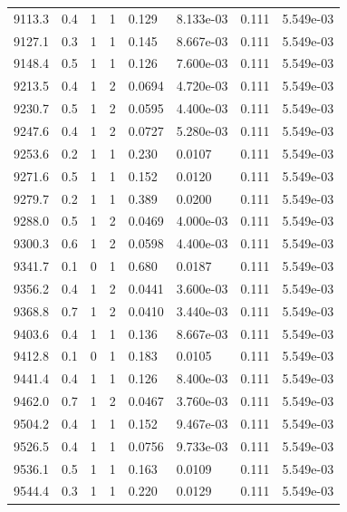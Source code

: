 \documentclass[preview]{standalone}
\begin{document}
{{{{{{{{{{{{\begin{tabular}{L{1.2cm}C{1.2cm} C{0.3cm}C{0.5cm} C{1.4cm}C{1.4cm} C{1.4cm}C{1.4cm}}
  9113.3  &   0.4  & 1     &  1 &  0.129  & 8.133e-03  & 0.111 &  5.549e-03   \\ 
  9127.1  &   0.3  & 1     &  1 &  0.145  & 8.667e-03  & 0.111 &  5.549e-03   \\ 
  9148.4  &   0.5  & 1     &  1 &  0.126  & 7.600e-03  & 0.111 &  5.549e-03   \\ 
  9213.5  &   0.4  & 1     &  2 &  0.0694  & 4.720e-03  & 0.111 &  5.549e-03   \\ 
  9230.7  &   0.5  & 1     &  2 &  0.0595  & 4.400e-03  & 0.111 &  5.549e-03   \\ 
  9247.6  &   0.4  & 1     &  2 &  0.0727  & 5.280e-03  & 0.111 &  5.549e-03   \\ 
  9253.6  &   0.2  & 1     &  1 &  0.230  & 0.0107  & 0.111 &  5.549e-03   \\ 
  9271.6  &   0.5  & 1     &  1 &  0.152  & 0.0120  & 0.111 &  5.549e-03   \\ 
  9279.7  &   0.2  & 1     &  1 &  0.389  & 0.0200  & 0.111 &  5.549e-03   \\ 
  9288.0  &   0.5  & 1     &  2 &  0.0469  & 4.000e-03  & 0.111 &  5.549e-03   \\ 
  9300.3  &   0.6  & 1     &  2 &  0.0598  & 4.400e-03  & 0.111 &  5.549e-03   \\ 
  9341.7  &   0.1  & 0     &  1 &  0.680  & 0.0187  & 0.111 &  5.549e-03   \\ 
  9356.2  &   0.4  & 1     &  2 &  0.0441  & 3.600e-03  & 0.111 &  5.549e-03   \\ 
  9368.8  &   0.7  & 1     &  2 &  0.0410  & 3.440e-03  & 0.111 &  5.549e-03   \\ 
  9403.6  &   0.4  & 1     &  1 &  0.136  & 8.667e-03  & 0.111 &  5.549e-03   \\ 
  9412.8  &   0.1  & 0     &  1 &  0.183  & 0.0105  & 0.111 &  5.549e-03   \\ 
  9441.4  &   0.4  & 1     &  1 &  0.126  & 8.400e-03  & 0.111 &  5.549e-03   \\ 
  9462.0  &   0.7  & 1     &  2 &  0.0467  & 3.760e-03  & 0.111 &  5.549e-03   \\ 
  9504.2  &   0.4  & 1     &  1 &  0.152  & 9.467e-03  & 0.111 &  5.549e-03   \\ 
  9526.5  &   0.4  & 1     &  1 &  0.0756  & 9.733e-03  & 0.111 &  5.549e-03   \\ 
  9536.1  &   0.5  & 1     &  1 &  0.163  & 0.0109  & 0.111 &  5.549e-03   \\ 
  9544.4  &   0.3  & 1     &  1 &  0.220  & 0.0129  & 0.111 &  5.549e-03   \\ 

\end{tabular}}}}}}}}}}}}}
\end{document}
